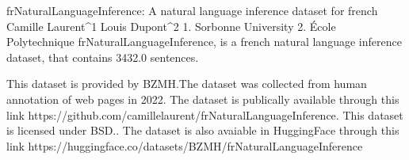 
frNaturalLanguageInference: A natural language inference dataset for french
Camille Laurent^1 Louis Dupont^2
1. Sorbonne University 2. École Polytechnique
frNaturalLanguageInference, is a french natural language inference dataset, that contains 3432.0 sentences.

This dataset is provided by BZMH.The dataset was collected from human annotation of web pages in 2022. 
The dataset is publically available through this link https://github.com/camillelaurent/frNaturalLanguageInference. This dataset is licensed under BSD..
The dataset is also avaiable in HuggingFace through this link https://huggingface.co/datasets/BZMH/frNaturalLanguageInference
